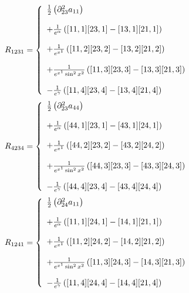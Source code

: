 \begin{align}
R_{1231}&= \left\{\begin{array}{l}
\frac{1}{2}\left(\partial^2_{23} a_{11}\right)\\\\
+ \frac{1}{e^{\alpha}}\left( [11,1] [23,1] -[13,1] [21,1]  \right)\\\\
+ \frac{1}{e^{x^1}}\left( [11,2] [23,2] -[13,2] [21,2]  \right)\\\\
+ \frac{1}{e^{x^1}\sin^2 x^2}\left( [11,3] [23,3] -[13,3] [21,3]  \right)\\\\
-\frac{1}{e^{\gamma}}\left( [11,4] [23,4] -[13,4] [21,4]  \right)
\end {array}\right.\\
\end{align}
\begin{align}
R_{4234}&= \left\{\begin{array}{l}
\frac{1}{2}\left(\partial^2_{23} a_{44}\right)\\\\
+ \frac{1}{e^{\alpha}}\left( [44,1] [23,1] -[43,1] [24,1]  \right)\\\\
+ \frac{1}{e^{x^1}}\left( [44,2] [23,2] -[43,2] [24,2]  \right)\\\\
+ \frac{1}{e^{x^1}\sin^2 x^2}\left( [44,3] [23,3] -[43,3] [24,3]  \right)\\\\
-\frac{1}{e^{\gamma}}\left( [44,4] [23,4] -[43,4] [24,4]  \right)
\end {array}\right.\\
\end{align}
\begin{align}
R_{1241}&= \left\{\begin{array}{l}
\frac{1}{2}\left(\partial^2_{24} a_{11}\right)\\\\
+ \frac{1}{e^{\alpha}}\left( [11,1] [24,1] -[14,1] [21,1]  \right)\\\\
+ \frac{1}{e^{x^1}}\left( [11,2] [24,2] -[14,2] [21,2]  \right)\\\\
+ \frac{1}{e^{x^1}\sin^2 x^2}\left( [11,3] [24,3] -[14,3] [21,3]  \right)\\\\
-\frac{1}{e^{\gamma}}\left( [11,4] [24,4] -[14,4] [21,4]  \right)
\end {array}\right.\\
\end{align}

